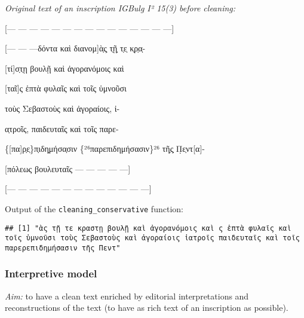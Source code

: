\documentclass[]{article}
\newenvironment{Shaded}{\begin{snugshade}}{\end{snugshade}}
\newcommand{\DecValTok}[1]{\textcolor[rgb]{0.00,0.00,0.81}{#1}}
\newcommand{\KeywordTok}[1]{\textcolor[rgb]{0.13,0.29,0.53}{\textbf{#1}}}
\newcommand{\NormalTok}[1]{#1}
\newcommand{\OperatorTok}[1]{\textcolor[rgb]{0.81,0.36,0.00}{\textbf{#1}}}
\newcommand{\StringTok}[1]{\textcolor[rgb]{0.31,0.60,0.02}{#1}}
\begin{document}
\emph{Original text of an inscription IGBulg I² 15(3) before cleaning:}

{[}--- --- --- --- --- --- --- --- --- --- --- --- --- --- ---{]}

{[}--- --- ---δόντα καὶ διανομ{]}ὰ̣ς̣ τ̣ῇ̣ τ̣ε̣ κ̣ρ̣α̣-

{[}τί{]}σ̣τ̣ῃ βουλῇ καὶ ἀγορανόμοις καὶ

{[}ταῖ{]}ς ἑπτὰ φυλαῖς καὶ τοῖς ὑμνοῦσι

τοὺς Σεβαστοὺς καὶ ἀγοραίοις, ἰ-

α̣τροῖς, παιδευταῖς καὶ τοῖς παρε-

\{{[}πα{]}ρ̣ε̣\}π̣ιδη̣μήσα̣σιν \{²⁶παρεπιδημήσασιν\}²⁶ τῆ̣ς̣ Π̣ε̣ντ{[}α{]}-

{[}πόλεως βουλευταῖς --- --- --- --- ---{]}

{[}--- --- --- --- --- --- --- --- --- --- --- --- ---{]}

Output of the \texttt{cleaning\_conservative} function:

\begin{Shaded}
\end{Shaded}

\begin{verbatim}
## [1] "ὰς τῇ τε κραστῃ βουλῇ καὶ ἀγορανόμοις καὶ ς ἑπτὰ φυλαῖς καὶ τοῖς ὑμνοῦσι τοὺς Σεβαστοὺς καὶ ἀγοραίοις ἰατροῖς παιδευταῖς καὶ τοῖς παρερεπιδημήσασιν τῆς Πεντ"
\end{verbatim}

\hypertarget{interpretive-model}{%
\subsubsection{Interpretive model}\label{interpretive-model}}

\emph{Aim:} to have a clean text enriched by editorial interpretations
and reconstructions of the text (to have as rich text of an inscription
as possible).
\end{document}
